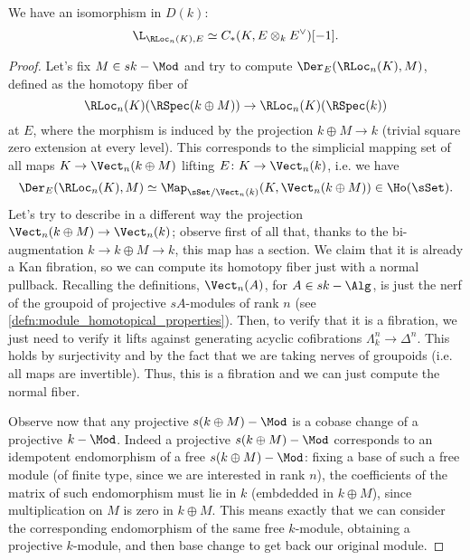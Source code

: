             
            \begin{prop}
                \label{prop:local_system_cotangent}
                We have an isomorphism in $D(k)$: \[ \L_{\RLoc_n(K), E} \simeq C_*(K, E \otimes_k E^{\vee})[-1]. \]
            \end{prop}
            \begin{proof}
                Let's fix $M \in sk-\Mod$ and try to compute $\Der_E(\RLoc_n(K), M)$, defined as the homotopy fiber of \[\RLoc_n(K)(\RSpec(k \oplus M)) \to \RLoc_n(K)(\RSpec(k)) \] at $E$, where the morphism is induced by the projection $k \oplus M \to k$ (trivial square zero extension at every level). This corresponds to the simplicial mapping set of all maps $K \to \Vect_n(k \oplus M)$ lifting $E\colon K \to \Vect_n(k)$, i.e. we have \[\Der_E(\RLoc_n(K), M) \simeq \Map_{\sSet/\Vect_n(k)}(K, \Vect_n(k \oplus M)) \in \Ho(\sSet). \] Let's try to describe in a different way the projection $\Vect_n(k \oplus M) \to \Vect_n(k)$; observe first of all that, thanks to the bi-augmentation $k \to k \oplus M \to k$, this map has a section. We claim that it is already a Kan fibration, so we can compute its homotopy fiber just with a normal pullback. Recalling the definitions, $\Vect_n(A)$, for $A \in sk-\Alg$, is just the nerf of the groupoid of projective $sA$-modules of rank $n$ (see \cref{defn:module_homotopical_properties}). Then, to verify that it is a fibration, we just need to verify it lifts against generating acyclic cofibrations $\Lambda^n_k \to \Delta^n$. This holds by surjectivity and by the fact that we are taking nerves of groupoids (i.e. all maps are invertible). Thus, this is a fibration and we can just compute the normal fiber.
                
                Observe now that any projective $s(k \oplus M)-\Mod$ is a cobase change of a projective $k-\Mod$. Indeed a projective $s(k \oplus M)-\Mod$ corresponds to an idempotent endomorphism of a free $s(k\oplus M)-\Mod$: fixing a base of such a free module (of finite type, since we are interested in rank $n$), the coefficients of the matrix of such endomorphism must lie in $k$ (embdedded in $k\oplus M$), since multiplication on $M$ is zero in $k\oplus M$. This means exactly that we can consider the corresponding endomorphism of the same free $k$-module, obtaining a projective $k$-module, and then base change to get back our original module.


\end{proof}
